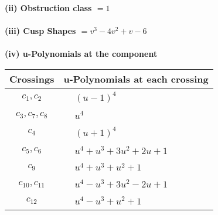 \documentclass[1p]{elsarticle_modified}
\theoremstyle{definition}
\begin{document}
\flushleft \textbf{(ii) Obstruction class $= 1$}\\~\\
\flushleft \textbf{(iii) Cusp Shapes $= v^3-4 v^2+v-6$}\\~\\
\newpage\renewcommand{\arraystretch}{1}
\flushleft \textbf{(iv) u-Polynomials at the component}\newline \\
\begin{tabular}{m{50pt}|m{274pt}}
Crossings & \hspace{64pt}u-Polynomials at each crossing \\
\hline $$\begin{aligned}c_{1},c_{2}\end{aligned}$$&$\begin{aligned}
&(u-1)^4
\end{aligned}$\\
\hline $$\begin{aligned}c_{3},c_{7},c_{8}\end{aligned}$$&$\begin{aligned}
&u^4
\end{aligned}$\\
\hline $$\begin{aligned}c_{4}\end{aligned}$$&$\begin{aligned}
&(u+1)^4
\end{aligned}$\\
\hline $$\begin{aligned}c_{5},c_{6}\end{aligned}$$&$\begin{aligned}
&u^4+u^3+3 u^2+2 u+1
\end{aligned}$\\
\hline $$\begin{aligned}c_{9}\end{aligned}$$&$\begin{aligned}
&u^4+u^3+u^2+1
\end{aligned}$\\
\hline $$\begin{aligned}c_{10},c_{11}\end{aligned}$$&$\begin{aligned}
&u^4- u^3+3 u^2-2 u+1
\end{aligned}$\\
\hline $$\begin{aligned}c_{12}\end{aligned}$$&$\begin{aligned}
&u^4- u^3+u^2+1
\end{aligned}$\\
\hline
\end{tabular}\\~\\
\end{document}
